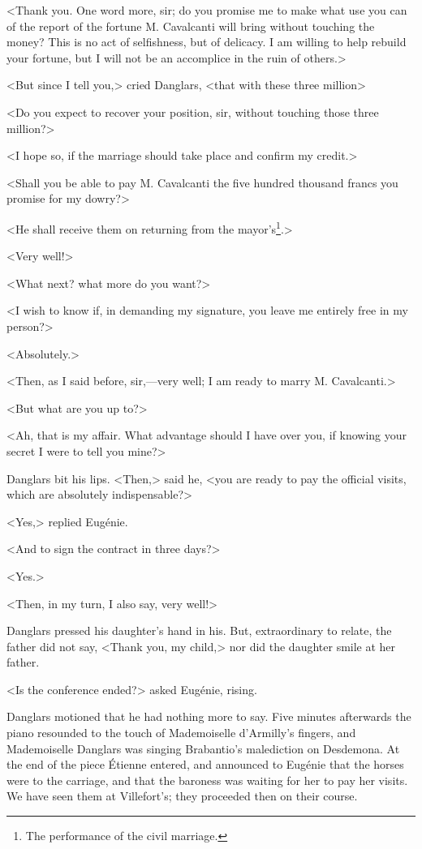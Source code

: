  <Thank you. One word more, sir; do you promise me to make what use you can of the report of the fortune M. Cavalcanti will bring without touching the money? This is no act of selfishness, but of delicacy. I am willing to help rebuild your fortune, but I will not be an accomplice in the ruin of others.> 

 <But since I tell you,> cried Danglars, <that with these three million\longdash> 

 <Do you expect to recover your position, sir, without touching those three million?> 

 <I hope so, if the marriage should take place and confirm my credit.> 

 <Shall you be able to pay M. Cavalcanti the five hundred thousand francs you promise for my dowry?> 

 <He shall receive them on returning from the mayor's\footnote{The performance of the civil marriage. }.> 

 <Very well!> 

 <What next? what more do you want?> 

 <I wish to know if, in demanding my signature, you leave me entirely free in my person?> 

 <Absolutely.> 

 <Then, as I said before, sir,—very well; I am ready to marry M. Cavalcanti.> 

 <But what are you up to?> 

 <Ah, that is my affair. What advantage should I have over you, if knowing your secret I were to tell you mine?> 

 Danglars bit his lips. <Then,> said he, <you are ready to pay the official visits, which are absolutely indispensable?> 

 <Yes,> replied Eugénie. 

 <And to sign the contract in three days?> 

 <Yes.> 

 <Then, in my turn, I also say, very well!> 

 Danglars pressed his daughter's hand in his. But, extraordinary to relate, the father did not say, <Thank you, my child,> nor did the daughter smile at her father. 

 <Is the conference ended?> asked Eugénie, rising. 

 Danglars motioned that he had nothing more to say. Five minutes afterwards the piano resounded to the touch of Mademoiselle d'Armilly's fingers, and Mademoiselle Danglars was singing Brabantio's malediction on Desdemona. At the end of the piece Étienne entered, and announced to Eugénie that the horses were to the carriage, and that the baroness was waiting for her to pay her visits. We have seen them at Villefort's; they proceeded then on their course. 